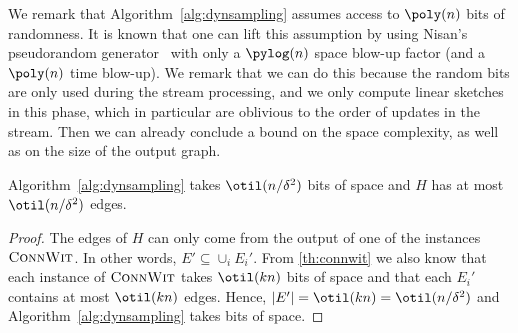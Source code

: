 We remark that Algorithm~\ref{alg:dynsampling} assumes access to $\poly(n)$ bits of randomness. It is known that one can lift this assumption by using Nisan's pseudorandom generator~\cite{nisansprg,lpindyk} with only a $\pylog(n)$ space blow-up factor (and a $\poly(n)$ time blow-up). We remark that we can do this because the random bits are only used during the stream processing, and we only compute linear sketches in this phase, which in particular are oblivious to the order of updates in the stream. Then we can already conclude a bound on the space complexity, as well as on the size of the output graph.
\begin{lemma}
	\label{lem:spacesampling}
	Algorithm~\ref{alg:dynsampling} takes $\otil(n/\delta^2)$ bits of space and $H$ has at most $\otil(n/\delta^2)$ edges.
\end{lemma}
\begin{proof}
	The edges of $H$ can only come from the output of one of the instances $\textsc{ConnWit}$. In other words, $E' \subseteq \cup_i E_i'$. From \cref{th:connwit} we also know that each instance of $\textsc{ConnWit}$ takes $\otil(kn)$ bits of space and that each $E_i'$ contains at most $\otil(kn)$ edges. Hence, $|E'| = \otil(kn)=\otil(n/\delta^2)$ and Algorithm~\ref{alg:dynsampling} takes  bits of space.
\end{proof}

